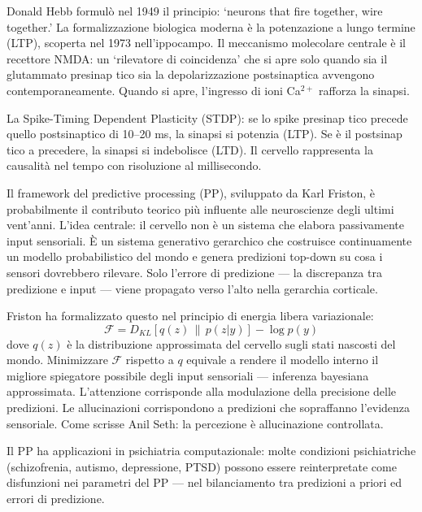 \documentclass[12pt,a4paper,openany]{book}
\newcommand{\sezione}[1]{\vspace{1.2em}{\large\bfseries #1}\vspace{0.5em}\par}
\begin{document}
\sezione{Plasticità sinaptica: la regola di Hebb e la STDP}

Donald Hebb formulò nel 1949 il principio: `neurons that fire together, wire together.' La formalizzazione biologica moderna è la potenzazione a lungo termine (LTP), scoperta nel 1973 nell'ippocampo. Il meccanismo molecolare centrale è il recettore NMDA: un `rilevatore di coincidenza' che si apre solo quando sia il glutammato presinap tico sia la depolarizzazione postsinaptica avvengono contemporaneamente. Quando si apre, l'ingresso di ioni Ca$^{2+}$ rafforza la sinapsi.

La Spike-Timing Dependent Plasticity (STDP): se lo spike presinap tico precede quello postsinaptico di 10--20 ms, la sinapsi si potenzia (LTP). Se è il postsinap tico a precedere, la sinapsi si indebolisce (LTD). Il cervello rappresenta la causalità nel tempo con risoluzione al millisecondo.

\sezione{Predictive processing: il cervello come sistema di inferenza bayesiana}

Il framework del predictive processing (PP), sviluppato da Karl Friston, è probabilmente il contributo teorico più influente alle neuroscienze degli ultimi vent'anni. L'idea centrale: il cervello non è un sistema che elabora passivamente input sensoriali. È un sistema generativo gerarchico che costruisce continuamente un modello probabilistico del mondo e genera predizioni top-down su cosa i sensori dovrebbero rilevare. Solo l'errore di predizione — la discrepanza tra predizione e input — viene propagato verso l'alto nella gerarchia corticale.

Friston ha formalizzato questo nel principio di energia libera variazionale:
\[
\mathcal{F} = D_{KL}[q(z) \,\|\, p(z|y)] - \log p(y)
\]
dove $q(z)$ è la distribuzione approssimata del cervello sugli stati nascosti del mondo. Minimizzare $\mathcal{F}$ rispetto a $q$ equivale a rendere il modello interno il migliore spiegatore possibile degli input sensoriali — inferenza bayesiana approssimata. L'attenzione corrisponde alla modulazione della precisione delle predizioni. Le allucinazioni corrispondono a predizioni che sopraffanno l'evidenza sensoriale. Come scrisse Anil Seth: la percezione è allucinazione controllata.

Il PP ha applicazioni in psichiatria computazionale: molte condizioni psichiatriche (schizofrenia, autismo, depressione, PTSD) possono essere reinterpretate come disfunzioni nei parametri del PP — nel bilanciamento tra predizioni a priori ed errori di predizione.
\end{document}
